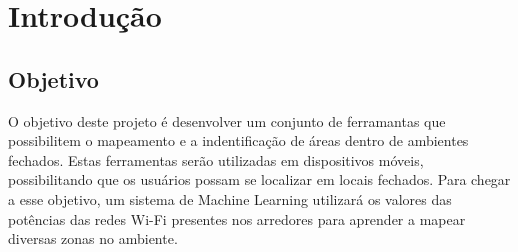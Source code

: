 \chapter{Introdução}\label{chp:introduction}

\section{Objetivo}\label{sec:objetctive}
O objetivo deste projeto é desenvolver um conjunto de ferramantas que possibilitem
o mapeamento e a indentificação de áreas dentro de ambientes fechados. Estas
ferramentas serão utilizadas em dispositivos móveis, possibilitando que os
usuários possam se localizar em locais fechados. Para chegar a esse objetivo, um
sistema de Machine Learning utilizará os valores das potências das redes Wi-Fi
presentes nos arredores para aprender a mapear diversas zonas no ambiente.

